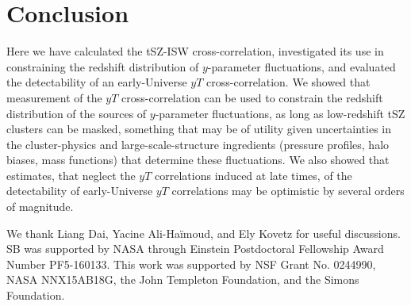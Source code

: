 \documentclass[aps,twocolumn,floats,prd,nofootinbib,10pt,floatfix]{revtex4-1}
\begin{document}
\section{Conclusion}
\label{sec:concl}

Here we have calculated the tSZ-ISW cross-correlation,
investigated its use in constraining the redshift distribution
of $y$-parameter fluctuations, and evaluated the detectability
of an early-Universe $yT$ cross-correlation.  We showed that
measurement of the $yT$ cross-correlation can be used to
constrain the redshift distribution of the sources of
$y$-parameter fluctuations, as long as low-redshift tSZ clusters
can be masked, something that may be of utility
given uncertainties in the cluster-physics and
large-scale-structure ingredients (pressure profiles, halo
biases, mass functions) that determine these fluctuations.  We
also showed that estimates, that neglect the $yT$
correlations induced at late times, of the detectability of
early-Universe $yT$ correlations may be optimistic by several
orders of magnitude.

\begin{acknowledgments}
We thank Liang Dai, Yacine Ali-Ha\"{i}moud, and Ely
Kovetz for useful discussions.  SB was supported by NASA through
Einstein Postdoctoral Fellowship Award Number PF5-160133.  This
work was supported by NSF Grant No. 0244990, NASA NNX15AB18G,
the John Templeton Foundation, and the Simons Foundation.
\end{acknowledgments}
\end{document}
